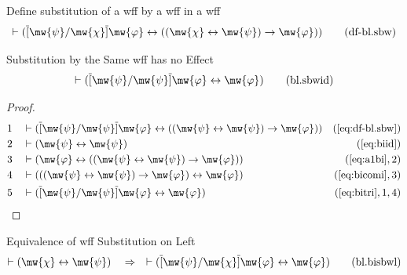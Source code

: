 \begin{metadefinition} {Define substitution of a wff by a wff}
in a wff
\begin{align}
\vdash ( \overline{[} \mw{\psi} / \mw{\chi} \overline{]} \mw{\varphi}
    \leftrightarrow ( ( \mw{\chi} \leftrightarrow \mw{\psi} ) \rightarrow
    \mw{\varphi} ) )\label{eq:df-bl.sbw}\tag{df-bl.sbw}
\end{align}
\end{metadefinition}


\begin{lemma} {Substitution by the Same wff has no Effect}
\begin{align}
\vdash ( \overline{[} \mw{\psi} / \mw{\psi} \overline{]} \mw{\varphi}
    \leftrightarrow \mw{\varphi} )\label{eq:bl.sbwid}\tag{bl.sbwid}
\end{align}
\end{lemma}


\begin{proof}
\begin{align}
  1 &&  & \vdash ( \overline{[} \mw{\psi} / \mw{\psi} \overline{]} \mw{\varphi}
     \leftrightarrow ( ( \mw{\psi} \leftrightarrow
     \mw{\psi} ) \rightarrow \mw{\varphi} )
     )&(\mbox{\ref{eq:df-bl.sbw}})\notag
  \\ 2 &&  & \vdash ( \mw{\psi} \leftrightarrow \mw{\psi}
     )&(\mbox{\ref{eq:biid}})\notag
  \\ 3 &&  & \vdash ( \mw{\varphi} \leftrightarrow ( ( \mw{\psi}
     \leftrightarrow \mw{\psi} ) \rightarrow \mw{\varphi}
     ) )&(\mbox{\ref{eq:a1bi}},2)\notag
  \\ 4 &&  & \vdash ( ( ( \mw{\psi} \leftrightarrow \mw{\psi} ) \rightarrow
     \mw{\varphi} ) \leftrightarrow \mw{\varphi}
     )&(\mbox{\ref{eq:bicomi}},3)\notag
  \\ 5 &&  & \vdash ( \overline{[} \mw{\psi} / \mw{\psi} \overline{]}
     \mw{\varphi} \leftrightarrow \mw{\varphi}
     )&(\mbox{\ref{eq:bitri}},1,4)\notag
\end{align}
\end{proof}

\begin{lemma} {Equivalence of wff Substitution on Left}
\begin{align}
\vdash ( \mw{\chi} \leftrightarrow \mw{\psi} )\quad\Rightarrow\quad \vdash (
    \overline{[} \mw{\psi} / \mw{\chi} \overline{]} \mw{\varphi}
    \leftrightarrow \mw{\varphi} )\label{eq:bl.bisbwl}\tag{bl.bisbwl}
\end{align}
\end{lemma}


